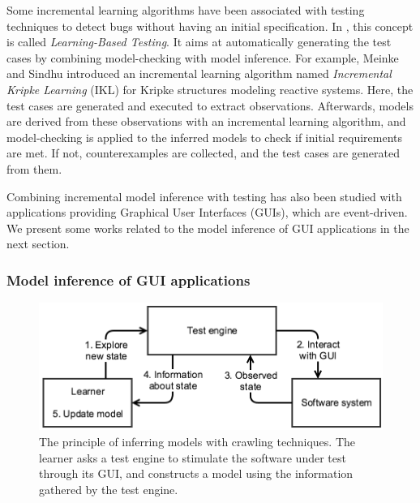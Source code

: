 Some incremental learning algorithms have been associated with
testing techniques to detect bugs without having an initial
specification. In \cite{Meinke:2004:ABT:1007512.1007532,tap2011},
this concept is called \textit{Learning-Based Testing}. It aims
at automatically generating the test cases by combining
model-checking with model inference. For example, Meinke and
Sindhu \cite{tap2011} introduced an incremental learning
algorithm named \textit{Incremental Kripke Learning} (IKL) for
Kripke structures modeling reactive systems. Here, the test
cases are generated and executed to extract observations.
Afterwards, models are derived from these observations with an
incremental learning algorithm, and model-checking is applied to
the inferred models to check if initial requirements are met. If
not, counterexamples are collected, and the test cases are
generated from them.

Combining incremental model inference with testing has also been
studied with applications providing Graphical User Interfaces
(GUIs), which are event-driven. We present some works related to
the model inference of GUI applications in the next section.

\subsubsection{Model inference of GUI applications}
\label{sec:active-crawling}

\begin{figure}[ht]
    \begin{center}
        \includegraphics[width=0.9\linewidth]{figures/crawler.png}
    \end{center}

    \caption{The principle of inferring models with crawling
    techniques. The learner asks a test engine to stimulate the
	software under test through its GUI, and constructs a model
	using the information gathered by the test engine.}
    \label{fig:crawler}
\end{figure}


